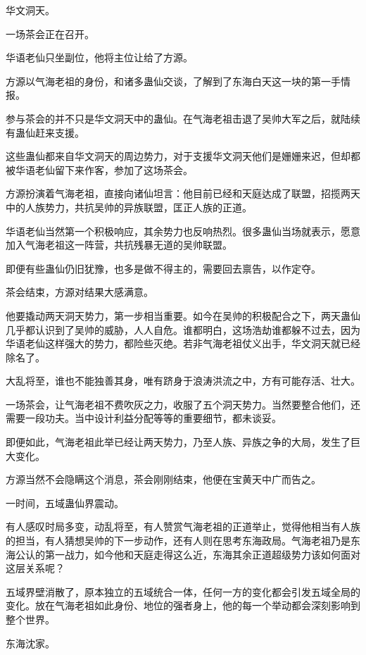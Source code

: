 
\begin{this_body}

华文洞天。

一场茶会正在召开。

华语老仙只坐副位，他将主位让给了方源。

方源以气海老祖的身份，和诸多蛊仙交谈，了解到了东海白天这一块的第一手情报。

参与茶会的并不只是华文洞天中的蛊仙。在气海老祖击退了吴帅大军之后，就陆续有蛊仙赶来支援。

这些蛊仙都来自华文洞天的周边势力，对于支援华文洞天他们是姗姗来迟，但却都被华语老仙留下来作客，参加了这场茶会。

方源扮演着气海老祖，直接向诸仙坦言：他目前已经和天庭达成了联盟，招揽两天中的人族势力，共抗吴帅的异族联盟，匡正人族的正道。

华语老仙当然第一个积极响应，其余势力也反响热烈。很多蛊仙当场就表示，愿意加入气海老祖这一阵营，共抗残暴无道的吴帅联盟。

即便有些蛊仙仍旧犹豫，也多是做不得主的，需要回去禀告，以作定夺。

茶会结束，方源对结果大感满意。

他要撬动两天洞天势力，第一步相当重要。如今在吴帅的积极配合之下，两天蛊仙几乎都认识到了吴帅的威胁，人人自危。谁都明白，这场浩劫谁都躲不过去，因为华语老仙这样强大的势力，都险些灭绝。若非气海老祖仗义出手，华文洞天就已经除名了。

大乱将至，谁也不能独善其身，唯有跻身于浪涛洪流之中，方有可能存活、壮大。

一场茶会，让气海老祖不费吹灰之力，收服了五个洞天势力。当然要整合他们，还需要一段功夫。当中设计利益分配等等的重要细节，都未谈妥。

即便如此，气海老祖此举已经让两天势力，乃至人族、异族之争的大局，发生了巨大变化。

方源当然不会隐瞒这个消息，茶会刚刚结束，他便在宝黄天中广而告之。

一时间，五域蛊仙界震动。

有人感叹时局多变，动乱将至，有人赞赏气海老祖的正道举止，觉得他相当有人族的担当，有人猜想吴帅的下一步动作，还有人则在思考东海政局。气海老祖乃是东海公认的第一战力，如今他和天庭走得这么近，东海其余正道超级势力该如何面对这层关系呢？

五域界壁消散了，原本独立的五域统合一体，任何一方的变化都会引发五域全局的变化。放在气海老祖如此身份、地位的强者身上，他的每一个举动都会深刻影响到整个世界。

东海沈家。


\end{this_body}
